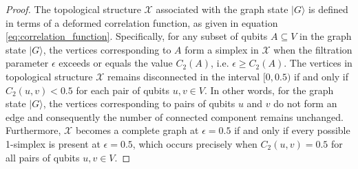 \documentclass{article}
\newcommand{\ket}[1]{|#1\rangle}
\begin{document}
\begin{proof}
The topological structure $ \mathcal{X} $ associated with the graph state $ \ket{G} $ is defined in terms of a deformed correlation function, as given in equation \eqref{eq:correlation_function}. Specifically, for any subset of qubits $ A \subseteq V $ in the graph state $ \ket{G} $, the vertices corresponding to $ A $ form a simplex in $ \mathcal{X} $ when the filtration parameter $ \epsilon $ exceeds or equals the value $ C_2(A) $, i.e. $ \epsilon \geq C_2(A) $. The vertices in topological structure $ \mathcal{X} $ remains disconnected in the interval $ [0, 0.5) $ if and only if $ C_2(u, v) < 0.5 $ for each pair of qubits $ u, v \in V $. In other words, for the graph state $ \ket{G} $, the vertices corresponding to pairs of qubits $ u $ and $ v $ do not form an edge and consequently the number of connected component remains unchanged.
Furthermore, $ \mathcal{X} $ becomes a complete graph at $ \epsilon = 0.5 $ if and only if every possible 1-simplex is present at $ \epsilon = 0.5 $, which occurs precisely when $ C_2(u, v) = 0.5 $ for all pairs of qubits $ u, v \in V $. 
\end{proof}


\end{document}
